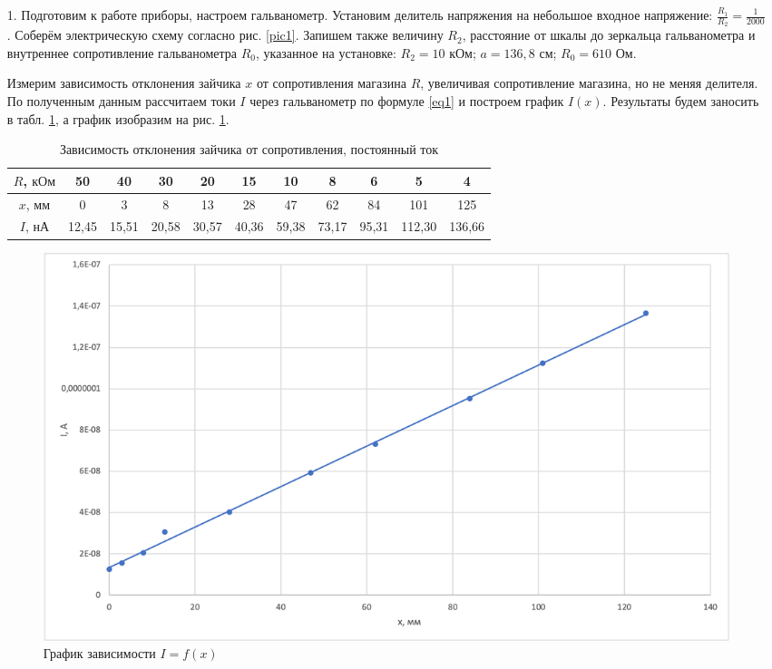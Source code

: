 \documentclass[a4paper, 12pt]{article}
\begin{document}
    \begin{enumerate}
    
        
        \item[1.] Подготовим к работе приборы, настроем гальванометр. Установим делитель напряжения на небольшое входное напряжение: $\frac{R_1}{R_2} = \frac{1}{2000}$. Соберём электрическую схему согласно рис. \ref{pic1}. Запишем также величину $R_2$, расстояние от шкалы до зеркальца гальванометра и внутреннее сопротивление гальванометра $R_0$, указанное на установке: $R_2 = 10 \text{ кОм}$; $a = 136,8 \text{ см}$; $R_0 = 610 \text{ Ом}$.
        
        Измерим зависимость отклонения зайчика $x$ от сопротивления магазина $R$, увеличивая сопротивление магазина, но не меняя делителя. По полученным данным рассчитаем токи $I$ через гальванометр по формуле \eqref{eq1} и построем график $I(x)$. Результаты будем заносить в табл. \ref{table1}, а график изобразим на рис. \ref{pic3}.
        
        \begin{table}[ht]
            \centering
            \begin{tabular}{|c||c|c|c|c|c|c|c|c|c|c|}
                \hline
                $R$, $\text{кОм}$ & 50 & 40 & 30 & 20 & 15 & 10 & 8 & 6 & 5 & 4 \\
                \hline
                $x$, $\text{мм}$ & 0 & 3 & 8 & 13 & 28 & 47 & 62 & 84 & 101 & 125 \\
                \hline
                $I$, $\text{нА}$ & 12,45 & 15,51 & 20,58 & 30,57 & 40,36 & 59,38 & 73,17 & 95,31 & 112,30 & 136,66 \\
                \hline
            \end{tabular}
            \caption{Зависимость отклонения зайчика от сопротивления, постоянный ток}
            \label{table1}
        \end{table}
        
        \begin{figure}[ht]
            \centering
            \includegraphics[width=0.9\linewidth]{images/I(x).png}
            \caption{График зависимости $I = f(x)$}
            \label{pic3}
        \end{figure}
        

\end{enumerate}
\end{document}
